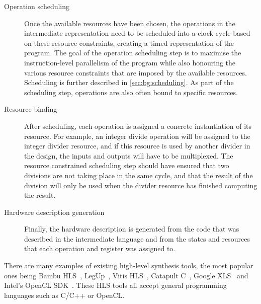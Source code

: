 \begin{description}
\item[Operation scheduling] Once the available resources have been chosen, the
  operations in the intermediate representation need to be scheduled into a
  clock cycle based on these resource constraints, creating a timed
  representation of the program.  The goal of the operation scheduling step is
  to maximise the instruction-level parallelism of the program while also
  honouring the various resource constraints that are imposed by the available
  resources.  Scheduling is further described in \cref{sec:bg:scheduling}.  As
  part of the scheduling step, operations are also often bound to specific
  resources.

\item[Resource binding] After scheduling, each operation is assigned a concrete
  instantiation of its resource.  For example, an integer divide operation will
  be assigned to the integer divider resource, and if this resource is used by
  another divider in the design, the inputs and outputs will have to be
  multiplexed.  The resource constrained scheduling step should have ensured
  that two divisions are not taking place in the same cycle, and that the result
  of the division will only be used when the divider resource has finished
  computing the result.

\item[Hardware description generation] Finally, the hardware description is
  generated from the code that was described in the intermediate language and
  from the states and resources that each operation and register was assigned
  to.
\end{description}

There are many examples of existing high-level synthesis tools, the most popular
ones being Bambu HLS~\cite{pilato13_bambu}, LegUp~\cite{canis13_l}, Vitis
HLS~\cite{amd23_vitis_high_synth}, Catapult
C~\cite{mentor20_catap_high_level_synth}, Google XLS~\cite{google23_xls} and
Intel's OpenCL SDK~\cite{intel20_sdk_openc_applic}.  These HLS tools all accept
general programming languages such as C/C++ or OpenCL.

